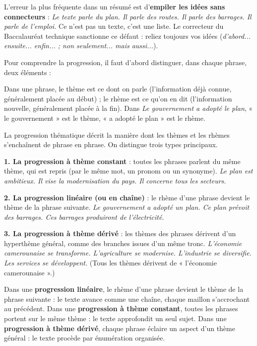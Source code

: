\documentclass[11pt]{article}
\newcommand{\cle}[1]{{\popxbold\color{popdark}#1}}
\newcounter{popsec}
\newcounter{popsub}
\newcommand{\courssub}[1]{%
  \stepcounter{popsub}%
  \par\vspace{9pt}\noindent{\popxbold\fontsize{11.5}{13}\selectfont\color{popink}{\color{poporange}\thepopsec.\thepopsub}\hspace{6pt}#1}\par\nopagebreak\vspace{4pt}
}
\begin{document}
\begin{attention}
L'erreur la plus fréquente dans un résumé est d'\textbf{empiler les idées sans connecteurs} : \emph{Le texte parle du plan. Il parle des routes. Il parle des barrages. Il parle de l'emploi.} Ce n'est pas un texte, c'est une liste. Le correcteur du Baccalauréat technique sanctionne ce défaut : reliez toujours vos idées (\emph{d'abord... ensuite... enfin... ; non seulement... mais aussi...}).
\end{attention}

\courssub{La notion de progression thématique}

Pour comprendre la progression, il faut d'abord distinguer, dans chaque phrase, deux éléments :

\begin{definition}
Dans une phrase, le \cle{thème} est ce dont on parle (l'information déjà connue, généralement placée au début) ; le \cle{rhème} est ce qu'on en dit (l'information nouvelle, généralement placée à la fin). Dans \emph{Le gouvernement \textbar{} a adopté le plan}, « le gouvernement » est le thème, « a adopté le plan » est le rhème.
\end{definition}

La \cle{progression thématique} décrit la manière dont les thèmes et les rhèmes s'enchaînent de phrase en phrase. On distingue trois types principaux.

\textbf{1. La progression à thème constant} : toutes les phrases parlent du même thème, qui est repris (par le même mot, un pronom ou un synonyme). \emph{Le plan est ambitieux. Il vise la modernisation du pays. Il concerne tous les secteurs.}

\textbf{2. La progression linéaire (ou en chaîne)} : le rhème d'une phrase devient le thème de la phrase suivante. \emph{Le gouvernement a adopté un plan. Ce plan prévoit des barrages. Ces barrages produiront de l'électricité.}

\textbf{3. La progression à thème dérivé} : les thèmes des phrases dérivent d'un hyperthème général, comme des branches issues d'un même tronc. \emph{L'économie camerounaise se transforme. L'agriculture se modernise. L'industrie se diversifie. Les services se développent.} (Tous les thèmes dérivent de « l'économie camerounaise ».)

\begin{propriete}
Dans une \textbf{progression linéaire}, le rhème d'une phrase devient le thème de la phrase suivante : le texte avance comme une chaîne, chaque maillon s'accrochant au précédent. Dans une \textbf{progression à thème constant}, toutes les phrases portent sur le même thème : le texte approfondit un seul sujet. Dans une \textbf{progression à thème dérivé}, chaque phrase éclaire un aspect d'un thème général : le texte procède par énumération organisée.
\end{propriete}
\end{document}
